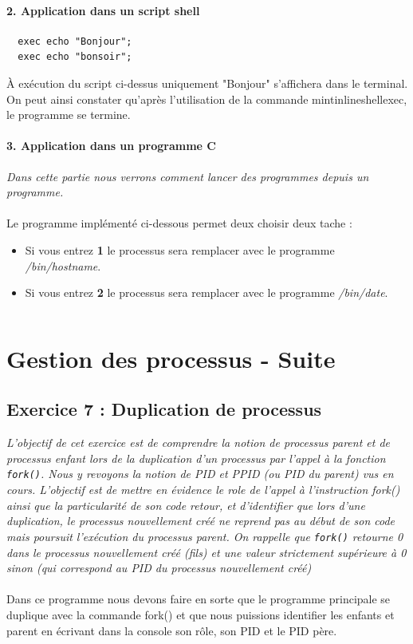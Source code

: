\paragraph{2. Application dans un script shell}
\begin{verbatim}
  exec echo "Bonjour";
  exec echo "bonsoir";
\end{verbatim}
À exécution du script ci-dessus uniquement "Bonjour" s'affichera dans le terminal. On peut ainsi constater qu'après l'utilisation de la commande mintinline{shell}{exec}, le programme se termine.

\paragraph{3. Application dans un programme C}
\textit{Dans cette partie nous verrons comment lancer  des programmes depuis un programme.}
\\\\
Le programme implémenté ci-dessous permet deux choisir deux tache :
\begin{itemize}
  \item Si vous entrez \textbf{1} le processus sera remplacer avec le programme \textit{/bin/hostname}.
  \item Si vous entrez \textbf{2} le processus sera remplacer avec le programme \textit{/bin/date}.
\end{itemize}

\inputminted[linenos,firstline=8,lastline=23]{cpp}{../sources/cpp/TP5-6/ex6.c}

\section{Gestion des processus - Suite}
\subsection{Exercice 7 : Duplication de processus}
\textit{L’objectif de cet exercice est de comprendre la notion de processus parent et de processus enfant lors de la duplication d’un processus par l’appel à la fonction \texttt{fork()}. Nous y revoyons la notion de PID et PPID (ou PID du parent) vus en cours. L’objectif est de mettre en évidence le role de l’appel à l’instruction fork() ainsi que la particularité de son code retour, et d’identifier que lors d’une duplication, le processus nouvellement créé ne reprend pas au début de son code mais poursuit l’exécution du processus parent. On rappelle que \texttt{fork()} retourne 0 dans le processus nouvellement créé (fils) et une valeur strictement supérieure à 0 sinon (qui correspond au PID du processus nouvellement créé)}
\\\\
Dans ce programme nous devons faire en sorte que le programme principale se duplique avec la commande fork() et que nous puissions identifier les enfants et parent en écrivant dans la console son rôle, son PID et le PID père.

